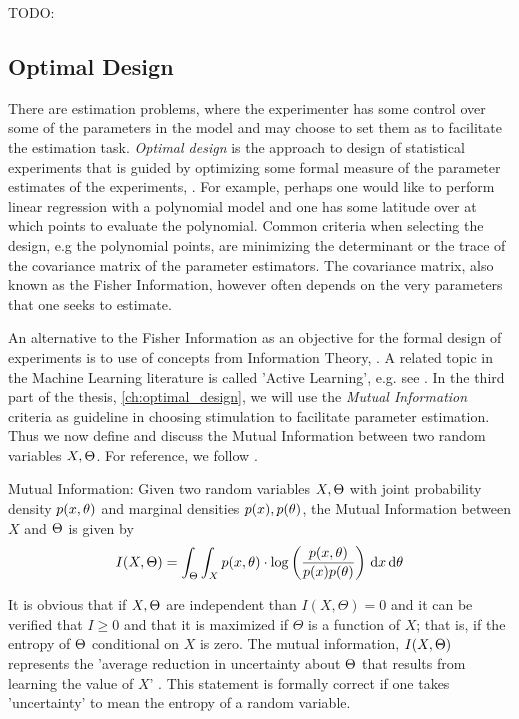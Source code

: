 TODO: 

\subsection{Optimal Design}
\label{sec:optimal_design}
There are estimation problems, where the experimenter has some control over some
of the parameters in the model and may choose to set them as to facilitate the
estimation task. {\sl Optimal design} is the approach to design of statistical
experiments that is guided by optimizing some formal measure of the parameter estimates of the experiments, \cite{Pukelsheim2006}. For example, perhaps one would like to
perform linear regression with a polynomial model and one has some latitude over
at which points to evaluate the polynomial. Common criteria when selecting the
design, e.g the polynomial points, are minimizing the determinant or the trace
of the covariance matrix of the parameter estimators. The covariance matrix,
also known as the Fisher Information, however often depends on the very
parameters that one seeks to estimate.

An alternative to the Fisher Information as an objective for the formal design
of experiments is to use of concepts from Information Theory, \cite{MacKay2003}.
A related topic in the Machine Learning literature is called 'Active Learning',
e.g. see \cite{Cohn1996,Settles2010,Seeger2008}. In the third part of the
thesis, \cref{ch:optimal_design}, we will use the {\sl Mutual Information}
criteria as guideline in choosing stimulation to facilitate parameter
estimation. Thus we now define and discuss the Mutual Information between two
random variables $X, {\Theta}$. For reference, we follow \cite{MacKay2003}.

\begin{defn}Mutual Information:
Given two random variables $X,{\Theta}$ with joint probability density
$p(x,{ \theta})$ and marginal densities $p(x), p({ \theta})$, the Mutual Information between
$X$ and ${\Theta}$ is given by
\begin{equation}
I(X,\Theta) = \int_\Theta \int_X p(x,{ \theta}) \cdot \log \left(
\frac{p(x,{ \theta})}{p(x)p({ \theta})}\right) \, \mathrm{d} x \, \mathrm{d} { \theta}
\label{eq:mutual_info_defn}
\end{equation}
\end{defn}

It is obvious that if $X,{\Theta}$ are independent than $I(X,\Theta) = 0$ and it can
be verified that $I\geq0$ and that it is maximized if $\Theta$ is a function of
$X$; that is, if the entropy of ${\Theta}$ conditional on $X$ is zero. 
The mutual information, $I(X,{\Theta})$ represents the 'average
reduction in uncertainty about ${\Theta}$ that results from learning the value of
$X$' \cite{MacKay2003}. This statement is formally correct if one takes
 'uncertainty' to mean the entropy of a random
 variable.
 
